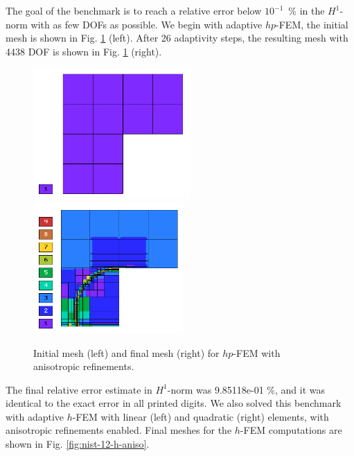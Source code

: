 The goal of the benchmark is to reach a relative error below
$10^{-1}$~\% in the $H^1$-norm with as few DOFs as possible.
We begin with adaptive $hp$-FEM, 
the initial mesh is shown in Fig. \ref{fig:nist-12-hp-aniso} (left).
After 26 adaptivity steps, the resulting mesh with 4438 DOF is shown 
in Fig. \ref{fig:nist-12-hp-aniso} (right).

\begin{figure}[!ht]
\centering
\includegraphics[height=5cm]{nist/nist-12/mesh_hp_aniso_init.png}\ \
\includegraphics[height=5cm]{nist/nist-12/mesh_hp_aniso.png}
\caption{Initial mesh (left) and final mesh (right) for $hp$-FEM with anisotropic refinements.}
\label{fig:nist-12-hp-aniso}
\end{figure}

The final relative error estimate in $H^1$-norm was 9.85118e-01 \%,
and it was identical to the exact error in all printed digits.
We also solved this benchmark with adaptive $h$-FEM
with linear (left) and quadratic (right)
elements, with anisotropic refinements enabled.
Final meshes for the $h$-FEM computations are shown
in Fig. \ref{fig:nist-12-h-aniso}.

